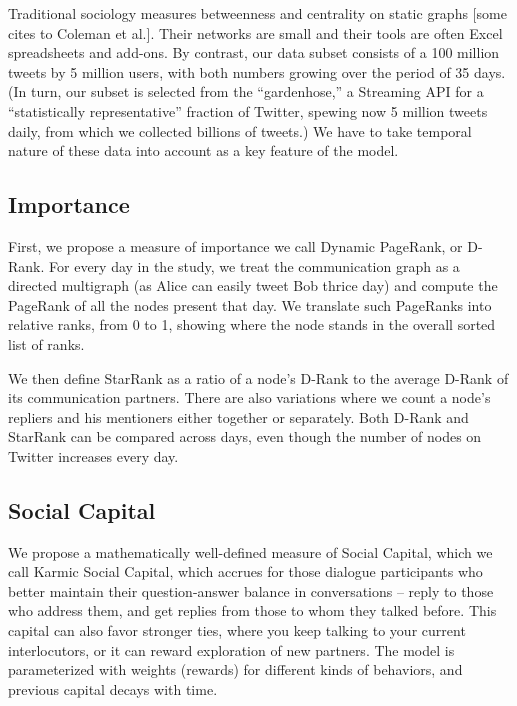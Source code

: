 	Traditional sociology measures betweenness and centrality on static graphs [some cites to Coleman et al.].  Their networks are small and their tools are often Excel spreadsheets and add-ons.  By contrast, our data subset consists of a 100 million tweets by 5 million users, with both numbers growing over the period of 35 days. (In turn, our subset is selected from the “gardenhose,” a Streaming API for a “statistically representative” fraction of Twitter, spewing now 5 million tweets daily, from which we collected billions of tweets.)  We have to take temporal nature of these data into account as a key feature of the model.

\subsection{Importance}

	First, we propose a measure of importance we call Dynamic PageRank, or D-Rank.  For every day in the study, we treat the communication graph as a directed multigraph (as Alice can easily tweet Bob thrice day) and compute the PageRank of all the nodes present that day.  We translate such PageRanks into relative ranks, from 0 to 1, showing where the node stands in the overall sorted list of ranks.

	We then define StarRank as a ratio of a node’s D-Rank to the average D-Rank of its communication partners.  There are also variations where we count a node’s repliers and his mentioners either together or separately.  Both D-Rank and StarRank can be compared across days, even though the number of nodes on Twitter increases every day.

\subsection{Social Capital}

	We propose a mathematically well-defined measure of Social Capital, which we call Karmic Social Capital, which accrues for those dialogue participants who better maintain their question-answer balance in conversations -- reply to those who address them, and get replies from those to whom they talked before.  This capital can also favor stronger ties, where you keep talking to your current interlocutors, or it can reward exploration of new partners.  The model is parameterized with weights (rewards) for different kinds of behaviors, and previous capital decays with time.
	
